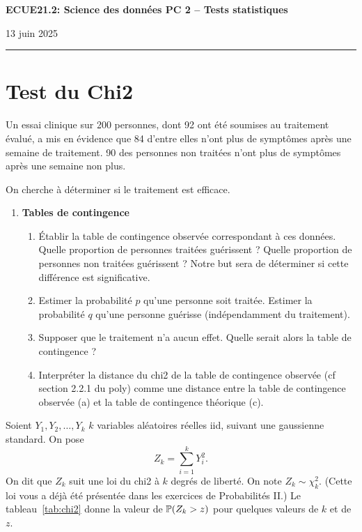 \documentclass[french,11pt]{article}
\begin{document}
\begin{center}
\bf\large ECUE21.2: Science des données \hfill
PC 2 -- Tests statistiques
\end{center}

\noindent
\hfill 13 juin 2025

\noindent
\rule{\textwidth}{.4pt}


\section*{Test du Chi2}
Un essai clinique sur 200 personnes, dont 92 ont été soumises au traitement
évalué, a mis en évidence que 84 d'entre elles n'ont plus de symptômes après
une semaine de traitement. 90 des personnes non traitées n'ont plus de
symptômes après une semaine non plus.

On cherche à déterminer si le traitement est efficace.

\begin{enumerate}
\item \textbf{Tables de contingence}
  \begin{enumerate}
  \item Établir la table de contingence observée correspondant à ces
    données. Quelle proportion de personnes traitées guérissent ? Quelle
    proportion de personnes non traitées guérissent ? Notre but sera de
    déterminer si cette différence est significative.
  \item Estimer la probabilité $p$ qu'une personne soit traitée. Estimer la
    probabilité $q$ qu'une personne guérisse (indépendamment du traitement).
  \item Supposer que le traitement n'a aucun effet. Quelle serait alors la
    table de contingence ?
  \item Interpréter la distance du chi2 de la table de contingence observée (cf
    section 2.2.1 du poly) comme une distance entre la table de contingence
    observée (a) et la table de contingence théorique (c).
  \end{enumerate}
\end{enumerate}

Soient $Y_1, Y_2, \dots, Y_k$ $k$ variables aléatoires réelles iid, suivant une
gaussienne standard. On pose
\[
  Z_k = \sum_{i=1}^k Y_i^2.
\]
On dit que $Z_k$ suit une loi du chi2 à $k$ degrés de liberté. On note
$Z_k \sim \chi_k^2$. (Cette loi vous a déjà été présentée dans les exercices de Probabilités II.)
Le tableau~\ref{tab:chi2} donne la valeur de $\mathbb{P}(Z_k > z)$ pour quelques
valeurs de $k$ et de $z$.
\end{document}
